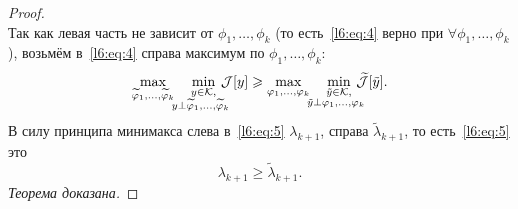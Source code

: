 \begin{proof}
\begin{equation}
	\end{equation}
	Так как левая часть не зависит от $\phi_1,\ldots,\phi_k$ (то есть~\eqref{l6:eq:4} верно при $\forall\phi_1,\ldots,\phi_k$), возьмём в~\eqref{l6:eq:4} справа максимум по $\phi_1,\ldots,\phi_k${\mb:}
	\begin{equation}
		\label{l6:eq:5}
		\max\limits_{\widetilde{\phi}_1,\ldots,\widetilde{\phi}_k}\quad\min\limits_{\substack{y\in\K,\\\lefteqn{\scriptstyle \hspace*{-0.8cm}y\perp\widetilde{\phi}_1,\ldots,\widetilde{\phi}_k}}}\,\J[y]\geqslant\max\limits_{{\phi}_1,\ldots,{\phi}_k}\quad\min\limits_{\substack{\tilde{y}\in\K,\\\lefteqn{\scriptstyle \hspace*{-0.8cm}\tilde{y}\perp\phi_1,\ldots,\phi_{k}}}}\,\widetilde{\J}[\tilde{y}].
	\end{equation}
	В силу принципа минимакса слева в~\eqref{l6:eq:5} $\lambda_{k+1}$, справа $\widetilde{\lambda}_{k+1}$, то есть~\eqref{l6:eq:5} это 
	\begin{equation}
		\label{l6:eq:6}
		\lambda_{k+1}\geqslant\widetilde{\lambda}_{k+1}.
	\end{equation}
	\emph{Теорема доказана.}
\end{proof}

